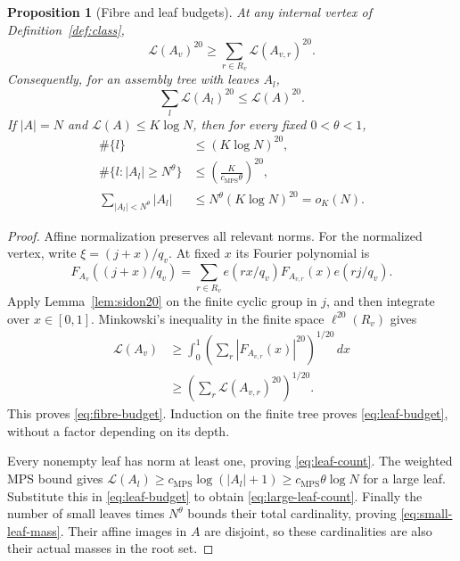 \documentclass[11pt,reqno]{amsart}
\numberwithin{equation}{section}
\newtheorem{proposition}[theorem]{Proposition}
\theoremstyle{definition}
\theoremstyle{remark}
\newcommand{\La}{\mathcal L}
\newcommand{\cMPS}{c_{\mathrm{MPS}}}
\begin{document}
\begin{proposition}[Fibre and leaf budgets]\label{prop:leaf-budget}
At any internal vertex of Definition~\ref{def:class},
\begin{equation}\label{eq:fibre-budget}
 \La(A_v)^{20}\ge\sum_{r\in R_v}\La(A_{v,r})^{20}.
\end{equation}
Consequently, for an assembly tree with leaves $A_l$,
\begin{equation}\label{eq:leaf-budget}
 \sum_l\La(A_l)^{20}\le\La(A)^{20}.
\end{equation}
If $|A|=N$ and $\La(A)\le K\log N$, then for every fixed
$0<\theta<1$,
\begin{align}
 \#\{l\}&\le(K\log N)^{20},\label{eq:leaf-count}\\
 \#\{l:|A_l|\ge N^\theta\}
 &\le\left(\frac{K}{\cMPS\theta}\right)^{20},
 \label{eq:large-leaf-count}\\
 \sum_{|A_l|<N^\theta}|A_l|
 &\le N^\theta(K\log N)^{20}=o_K(N).
 \label{eq:small-leaf-mass}
\end{align}
\end{proposition}
\begin{proof}
Affine normalization preserves all relevant norms. For the normalized
vertex, write $\xi=(j+x)/q_v$. At fixed $x$ its Fourier polynomial is
\[
 F_{A_v}((j+x)/q_v)
 =\sum_{r\in R_v} e(rx/q_v)F_{A_{v,r}}(x)e(rj/q_v).
\]
Apply Lemma~\ref{lem:sidon20} on the finite cyclic group in $j$, and
then integrate over $x\in[0,1]$. Minkowski's inequality in the finite
space $\ell^{20}(R_v)$ gives
\begin{align*}
 \La(A_v)
 &\ge\int_0^1
       \left(\sum_r|F_{A_{v,r}}(x)|^{20}\right)^{1/20}\,dx\\
 &\ge\left(\sum_r\La(A_{v,r})^{20}\right)^{1/20}.
\end{align*}
This proves \eqref{eq:fibre-budget}. Induction on the finite tree proves
\eqref{eq:leaf-budget}, without a factor depending on its depth.

Every nonempty leaf has norm at least one, proving
\eqref{eq:leaf-count}. The weighted MPS bound gives
$\La(A_l)\ge\cMPS\log(|A_l|+1)\ge\cMPS\theta\log N$
for a large leaf. Substitute this in \eqref{eq:leaf-budget} to obtain
\eqref{eq:large-leaf-count}. Finally the number of small leaves times
$N^\theta$ bounds their total cardinality, proving
\eqref{eq:small-leaf-mass}. Their affine images in $A$ are disjoint, so
these cardinalities are also their actual masses in the root set.
\end{proof}
\end{document}
